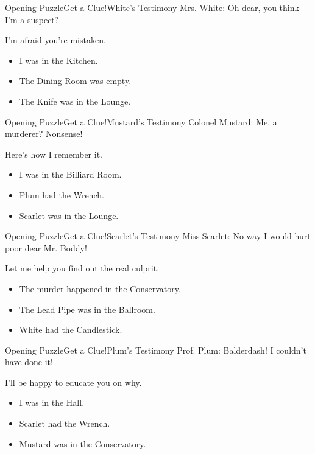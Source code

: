 \begin{customPuzzle}{Opening Puzzle}{Get a Clue!}{White's Testimony}
{\noindent\Large Mrs. White: Oh dear, you think I'm a suspect?}

I'm afraid you're mistaken.

\begin{itemize}
\item I was in the Kitchen.
\item The Dining Room was empty.
\item The Knife was in the Lounge.
\end{itemize}

\end{customPuzzle}
\begin{customPuzzle}{Opening Puzzle}{Get a Clue!}{Mustard's Testimony}
{\noindent\Large Colonel Mustard: Me, a murderer? Nonsense!}

Here's how I remember it.

\begin{itemize}
\item I was in the Billiard Room.
\item Plum had the Wrench.
\item Scarlet was in the Lounge.
\end{itemize}

\end{customPuzzle}
\begin{customPuzzle}{Opening Puzzle}{Get a Clue!}{Scarlet's Testimony}
{\noindent\Large Miss Scarlet: No way I would hurt poor dear Mr. Boddy!}

Let me help you find out the real culprit.

\begin{itemize}
\item The murder happened in the Conservatory.
\item The Lead Pipe was in the Ballroom.
\item White had the Candlestick.
\end{itemize}

\end{customPuzzle}
\begin{customPuzzle}{Opening Puzzle}{Get a Clue!}{Plum's Testimony}
{\noindent\Large Prof. Plum: Balderdash! I couldn't have done it!}

I'll be happy to educate you on why.

\begin{itemize}
\item I was in the Hall.
\item Scarlet had the Wrench.
\item Mustard was in the Conservatory.
\end{itemize}

\end{customPuzzle}
